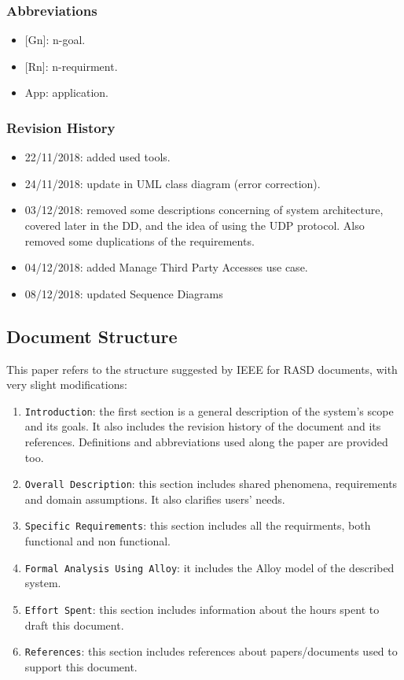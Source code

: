 \documentclass[12pt,a4paper]{article}
\begin{document}
		\subsubsection{Abbreviations}
			\begin{itemize}
				\item {[}Gn{]}: n-goal.
				\item {[Rn]}: n-requirment.
				\item {App}: application.
			\end{itemize}
		\subsubsection{Revision History}
			\begin{itemize}
				\item 22/11/2018: added used tools.
				\item 24/11/2018: update in UML class diagram (error correction).
				\item 03/12/2018: removed some descriptions concerning of system architecture, covered later in the DD, and the idea of using the UDP protocol. Also removed some duplications of the requirements.
				\item 04/12/2018: added Manage Third Party Accesses use case.
				\item 08/12/2018: updated Sequence Diagrams
			\end{itemize}

	\subsection{Document Structure}
		This paper refers to the structure suggested by IEEE for RASD documents, with very slight modifications:
		\begin{enumerate}
			\item \texttt{Introduction}: the first section is a general description of the system's scope and its goals. It also includes the revision history of the document and its references. Definitions and abbreviations used along the paper are provided too.
			\item \texttt{Overall Description}: this section includes shared phenomena, requirements and domain assumptions. It also clarifies users' needs.
			\item \texttt{Specific Requirements}: this section includes all the requirments, both functional and non functional.
			\item \texttt{Formal Analysis Using Alloy}: it includes the Alloy model of the described system.
			\item \texttt{Effort Spent}: this section includes information about the hours spent to draft this document.
			\item \texttt{References}: this section includes references about papers/documents used to support this document.
		\end{enumerate}
\end{document}
